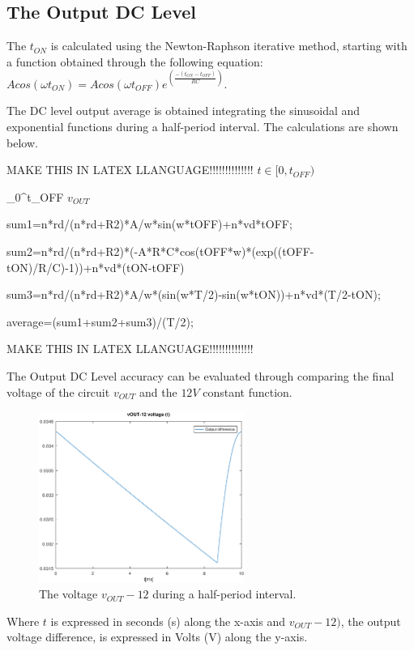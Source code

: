 \subsection{The Output DC Level}
\label{subsec:dclevel}

The $t_{ON}$ is calculated using the Newton-Raphson iterative method, starting with a function obtained through the following equation: $Acos(\omega t_{ON})=Acos(\omega t_{OFF})e^(\frac{-(t_{ON}-t_{OFF})}{RC})$.

The DC level output average is obtained integrating the sinusoidal and exponential functions during a half-period interval. The calculations are shown below.

MAKE THIS IN LATEX LLANGUAGE!!!!!!!!!!!!!!
$t\in[0,t_{OFF})$

\int _0^t_{OFF} $v_{OUT}$

sum1=n*rd/(n*rd+R2)*A/w*sin(w*tOFF)+n*vd*tOFF;



sum2=n*rd/(n*rd+R2)*(-A*R*C*cos(tOFF*w)*(exp((tOFF-tON)/R/C)-1))+n*vd*(tON-tOFF)



sum3=n*rd/(n*rd+R2)*A/w*(sin(w*T/2)-sin(w*tON))+n*vd*(T/2-tON);

average=(sum1+sum2+sum3)/(T/2);

MAKE THIS IN LATEX LLANGUAGE!!!!!!!!!!!!!!

The Output DC Level accuracy can be evaluated through comparing the final voltage of the circuit $v_{OUT}$ and the $12 V$ constant function. 

\begin{figure}[H] \centering
\includegraphics[width=0.6\textwidth]{outputdiff.eps}
\caption{The voltage $v_{OUT}-12$ during a half-period interval.}
\label{fig:outputdiff}
\end{figure}

Where $t$ is expressed in seconds (s) along the x-axis and 
$v_{OUT}-12)$, the output voltage difference, is expressed in Volts (V) along the y-axis.
